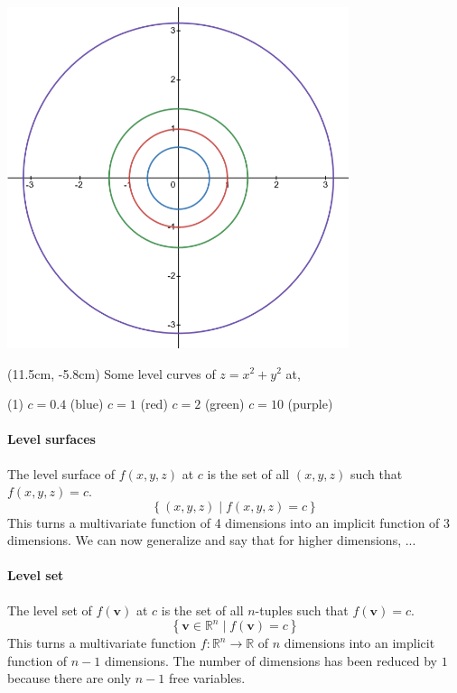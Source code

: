 \documentclass[14pt]{article}
\begin{document}
	\includegraphics[width=10cm]{level_curve1}
	\begin{textblock*}{7cm}(11.5cm, -5.8cm)
		\small \noindent Some level curves of $z=x^2 + y^2$ at,\\[-2em]
		
		\begin{tasks}(1)
			\task $c = 0.4$ (blue)
			\task $c = 1$ (red)
			\task $c = 2$ (green)
			\task $c = 10$ (purple)
		\end{tasks}
	\end{textblock*}

	\paragraph{Level surfaces} The level surface of $f(x, y, z)$ at $c$ is the set of all $(x, y, z)$ such that $f(x, y, z) = c$.
	\begin{equation*}
		\left\{ (x, y, z) \mid f(x, y, z) = c \right\} 
	\end{equation*}
	This turns a multivariate function of 4 dimensions into an implicit function of 3 dimensions. We can now generalize and say that for higher dimensions, ...
	
	\paragraph{Level set} The level set of $f(\mathbf{v})$ at $c$ is the set of all $n$-tuples such that $f(\mathbf{v}) = c$.
	\begin{equation*}
		\left\{ \mathbf{v} \in \mathbb{R}^n \mid f(\mathbf{v}) = c \right\} 
	\end{equation*}
	This turns a multivariate function $f: \mathbb{R}^n \rightarrow \mathbb{R}$ of $n$ dimensions into an implicit function of $n-1$ dimensions. The number of dimensions has been reduced by $1$ because there are only $n-1$ free variables. 
	
\end{document}
